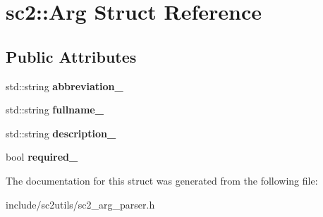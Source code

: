 \hypertarget{structsc2_1_1_arg}{}\section{sc2\+:\+:Arg Struct Reference}
\label{structsc2_1_1_arg}
\subsection*{Public Attributes}
\begin{DoxyCompactItemize}
\item 
\mbox{\label{structsc2_1_1_arg_ac7ee536715c0f89ed6b61365966765bd}} 
std\+::string {\bfseries abbreviation\+\_\+}
\item 
\mbox{\label{structsc2_1_1_arg_a31666378c9bab5f487d7221c8ca500bd}} 
std\+::string {\bfseries fullname\+\_\+}
\item 
\mbox{\label{structsc2_1_1_arg_a31fa9da9f7ec84d7eadab713f38dabcd}} 
std\+::string {\bfseries description\+\_\+}
\item 
\mbox{\label{structsc2_1_1_arg_ac1f3f8a74bebd8192697e45398a4b3e9}} 
bool {\bfseries required\+\_\+}
\end{DoxyCompactItemize}


The documentation for this struct was generated from the following file\+:\begin{DoxyCompactItemize}
\item 
include/sc2utils/sc2\+\_\+arg\+\_\+parser.\+h\end{DoxyCompactItemize}
